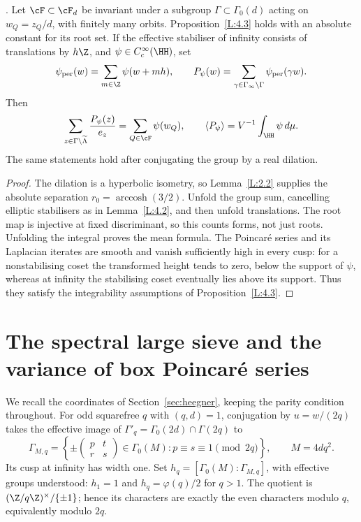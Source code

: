 \begin{corollary}\label{L:4.4}
. Let \(\cF\subset\cF_d\) be invariant under a subgroup
\(\Gamma\subset\Gamma_0(d)\) acting on \(w_Q=z_Q/d\), with finitely many
orbits. Proposition~\ref{L:4.3} holds with an absolute constant for its
root set. If the effective stabiliser of infinity consists of translations
by \(h\Z\), and \(\psi\in C_c^\infty(\HH)\), set
\[
 \psi_{\rm per}(w)=\sum_{m\in\Z}\psi(w+mh),\qquad
 P_\psi(w)=\sum_{\gamma\in\Gamma_\infty\backslash\Gamma}
                           \psi_{\rm per}(\gamma w).
\]
Then
\[
 \sum_{z\in\Gamma\backslash\widetilde\Lambda}\frac{P_\psi(z)}{e_z}
  =\sum_{Q\in\cF}\psi(w_Q),\qquad
 \langle P_\psi\rangle=V^{-1}\int_{\HH}\psi\,d\mu.
\]
The same statements hold after conjugating the group by a real dilation.
\end{corollary}
\begin{proof}
The dilation is a hyperbolic isometry, so Lemma~\ref{L:2.2} supplies the
absolute separation \(r_0=\operatorname{arccosh}(3/2)\).
Unfold the group sum, cancelling elliptic stabilisers as in
Lemma~\ref{L:4.2}, and then unfold translations. The root map is
injective at fixed discriminant, so this counts forms, not just roots.
Unfolding the integral proves the mean formula. The Poincar\'e series
and its Laplacian iterates are smooth and vanish sufficiently high in
every cusp: for a nonstabilising coset the transformed height tends to
zero, below the support of \(\psi\), whereas at infinity the stabilising
coset eventually lies above its support. Thus they satisfy the
integrability assumptions of Proposition~\ref{L:4.3}.
\end{proof}

\section{The spectral large sieve and the variance of box Poincar\'e series}
\label{sec:sieve}
We recall the coordinates of Section~\ref{sec:heegner}, keeping the parity
condition throughout. For odd squarefree \(q\) with \((q,d)=1\), conjugation
by \(u=w/(2q)\) takes the effective image of
\(\Gamma'_q=\Gamma_0(2d)\cap\Gamma(2q)\) to
\[
 \Gamma_{M,q}=\left\{\pm\begin{pmatrix}p&t\\r&s\end{pmatrix}
       \in\Gamma_0(M):p\equiv s\equiv1\pmod{2q}\right\},
 \qquad M=4dq^2.
\]
Its cusp at infinity has width one. Set
\(h_q=[\Gamma_0(M):\Gamma_{M,q}]\), with effective groups understood:
\(h_1=1\) and \(h_q=\varphi(q)/2\) for \(q>1\).
The quotient is \((\Z/q\Z)^\times/\{\pm1\}\); hence its characters are
exactly the even characters modulo \(q\), equivalently modulo \(2q\).

